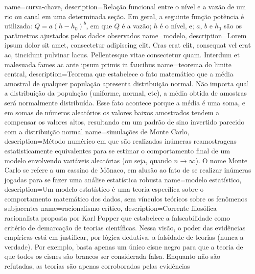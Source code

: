 {
    name=curva-chave,
    description={Relação funcional entre o nível e a vazão de um rio ou canal em uma determinada seção. Em geral, a seguinte função potência é utilizada: $Q = a(h - h_0)^b$, em que $Q$ é a vazão; $h$ é o nível, e; $a$, $b$ e $h_0$ são os parâmetros ajustados pelos dados observados}
}
{
    name=modelo,
    description={Lorem ipsum dolor sit amet, consectetur adipiscing elit. Cras erat elit, consequat vel erat ac, tincidunt pulvinar lacus. Pellentesque vitae consectetur quam. Interdum et malesuada fames ac ante ipsum primis in faucibus}
}
{
    name=teorema do limite central,
    description={Teorema que estabelece o fato matemático que a média amostral de qualquer população apresenta distribuição normal. Não importa qual a distribuição da população (uniforme, normal, etc), a média obtida de amostras será normalmente distribuída. Esse fato acontece porque a média é uma soma, e em somas de números aleatórios os valores baixos amostrados tendem a compensar os valores altos, resultando em um padrão de sino invertido parecido com a distribuição normal}
}
{
    name=simulações de Monte Carlo,
    description={Método numérico em que são realizadas inúmeras reamostragens estatisticamente equivalentes para se estimar o comportamento final de um modelo envolvendo variáveis aleatórias (ou seja, quando $n \to \infty$). O nome Monte Carlo se refere a um cassino de Mônaco, em alusão ao fato de se realizar inúmeras jogadas para se fazer uma análise estatística robusta}
}
{
    name=modelo estatístico,
    description={Um modelo estatístico é uma teoria específica sobre o comportamento matemático dos dados, sem vínculos teóricos sobre os fenômenos subjacentes}
}
{
    name=racionalismo crítico,
    description={Corrente filosófica racionalista proposta por Karl Popper que estabelece a falseabilidade como critério de demarcação de teorias científicas. Nessa visão, o poder das evidências empíricas está em justificar, por lógica dedutiva, a falsidade de teorias (nunca a verdade). Por exemplo, basta apenas um único cisne negro para que a teoria de que todos os cisnes são brancos ser considerada falsa. Enquanto não são refutadas, as teorias são apenas corroboradas pelas evidências}
}
